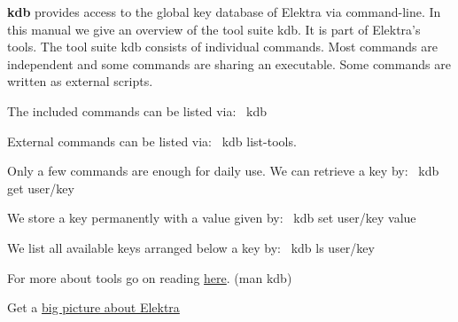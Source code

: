 {\bfseries kdb} provides access to the global key database of Elektra via command-\/line. In this manual we give an overview of the tool suite {\ttfamily kdb}. It is part of Elektra’s tools. The tool suite {\ttfamily kdb} consists of individual commands. Most commands are independent and some commands are sharing an executable. Some commands are written as external scripts.

The included commands can be listed via\+:~\newline
 {\ttfamily kdb}

External commands can be listed via\+:~\newline
 {\ttfamily kdb list-\/tools}.

Only a few commands are enough for daily use. We can retrieve a key by\+:~\newline
 {\ttfamily kdb get user/key}

We store a key permanently with a value given by\+:~\newline
 {\ttfamily kdb set user/key value}

We list all available keys arranged below a key by\+:~\newline
 {\ttfamily kdb ls user/key}


\begin{DoxyItemize}
\item For more about tools go on reading \hyperlink{md_doc_help_kdb_doc_help_kdb_md}{here}. ({\ttfamily man kdb})
\item Get a \hyperlink{doc_BIGPICTURE_md}{big picture about Elektra} 
\end{DoxyItemize}